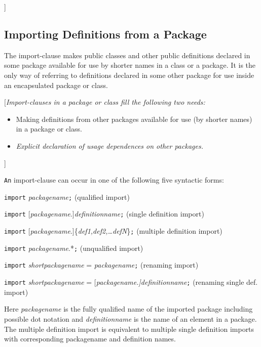 {]}

\subsection{Importing Definitions from a Package}

The import-clause makes public classes and other public definitions
declared in some package available for use by shorter names in a class
or a package. It is the only way of referring to definitions declared in
some other package for use inside an encapsulated package or class.

{[}\emph{Import-clauses in a package or class fill the following two
needs:}

\begin{itemize}
\item
  Making definitions from other packages available for use (by shorter
  names) in a package or class.
\item
  \emph{Explicit declaration of usage dependences on other packages.}
\end{itemize}

{]}

\lstinline!An! import-clause can occur in one of the following five syntactic forms:

\lstinline!import! \emph{packagename}\lstinline!;! (qualified import)

\lstinline!import! {[}\emph{packagename}.{]}\emph{definitionname}\lstinline!;! (single
definition import)

\lstinline!import!
{[}\emph{packagename}.{]}\{\emph{def1,def2,\ldots{}defN}\}\lstinline!;! (multiple
definition import)

\lstinline!import! \emph{packagename}.*\lstinline!;! (unqualified import)

\lstinline!import! \emph{shortpackagename} = \emph{packagename}\lstinline!;! (renaming
import)

\lstinline!import! \emph{shortpackagename} =
{[}\emph{packagename.{]}definitionname}\lstinline!;! (renaming single def. import)

Here \emph{packagename} is the fully qualified name of the imported
package including possible dot notation and \emph{definitionname} is the
name of an element in a package. The multiple definition import is
equivalent to multiple single definition imports with corresponding
packagename and definition names.

